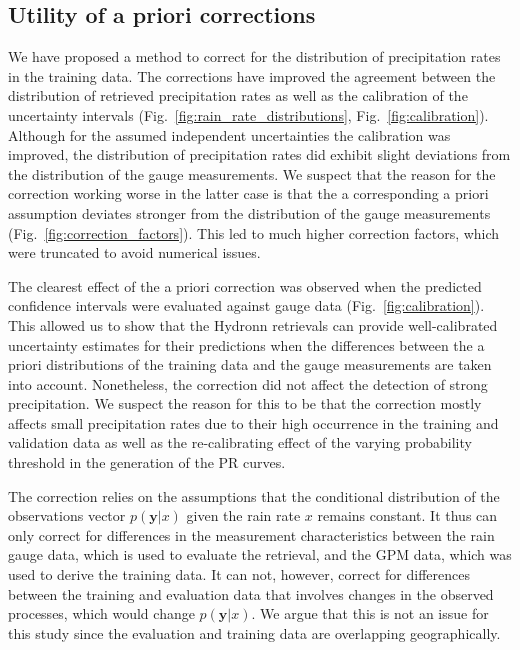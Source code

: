\documentclass[journal abbreviation, manuscript]{copernicus}
\begin{document}
\subsection{Utility of a priori corrections}

We have proposed a method to correct for the distribution of precipitation rates
in the training data. The corrections have improved the agreement between the
distribution of retrieved precipitation rates as well as the calibration of the
uncertainty intervals (Fig.~\ref{fig:rain_rate_distributions},
Fig.~\ref{fig:calibration}). Although for the assumed independent uncertainties
the calibration was improved, the distribution of precipitation rates did
exhibit slight deviations from the distribution of the gauge measurements. We
suspect that the reason for the correction working worse in the latter case is
that the a corresponding a priori assumption deviates stronger from the
distribution of the gauge measurements (Fig.~\ref{fig:correction_factors}). This
led to much higher correction factors, which were truncated to avoid numerical
issues.

The clearest effect of the a priori correction was observed when the predicted
confidence intervals were evaluated against gauge data
(Fig.~\ref{fig:calibration}). This allowed us to show that the Hydronn
retrievals can provide well-calibrated uncertainty estimates for their
predictions when the differences between the a priori distributions of the
training data and the gauge measurements are taken into account. Nonetheless,
the correction did not affect the detection of strong precipitation. We suspect
the reason for this to be that the correction mostly affects small precipitation
rates due to their high occurrence in the training and validation data as well
as the re-calibrating effect of the varying probability threshold in the
generation of the PR curves.

The correction relies on the assumptions that the conditional distribution of
the observations vector $p(\mathbf{y}|x)$ given the rain rate $x$ remains
constant. It thus can only correct for differences in the measurement
characteristics between the rain gauge data, which is used to evaluate the
retrieval, and the GPM data, which was used to derive the training data. It can
not, however, correct for differences between the training and evaluation data
that involves changes in the observed processes, which would change
$p(\mathbf{y}|x)$. We argue that this is not an issue for this study since the
evaluation and training data are overlapping geographically.
\end{document}
